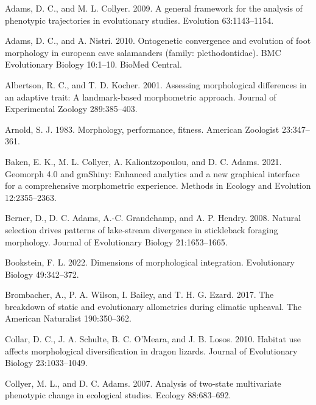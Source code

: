 \documentclass[
  11pt,
]{article}
\newlength{\cslhangindent}
\newlength{\cslentryspacingunit} %
\newenvironment{CSLReferences}[2] %
 {%
  \setlength{\parindent}{0pt}
  \ifodd #1
  \let\oldpar\par
  \def\par{\hangindent=\cslhangindent\oldpar}
  \fi
  \setlength{\parskip}{#2\cslentryspacingunit}
 }%
 {}
\begin{document}
\hypertarget{refs}{}
\begin{CSLReferences}{1}{0}
\leavevmode{}%
Adams, D. C., and M. L. Collyer. 2009. A general framework for the
analysis of phenotypic trajectories in evolutionary studies. Evolution
63:1143--1154.

\leavevmode{}%
Adams, D. C., and A. Nistri. 2010. Ontogenetic convergence and evolution
of foot morphology in european cave salamanders (family:
plethodontidae). BMC Evolutionary Biology 10:1--10. BioMed Central.

\leavevmode{}%
Albertson, R. C., and T. D. Kocher. 2001. Assessing morphological
differences in an adaptive trait: A landmark-based morphometric
approach. Journal of Experimental Zoology 289:385--403.

\leavevmode{}%
Arnold, S. J. 1983. Morphology, performance, fitness. American Zoologist
23:347--361.

\leavevmode{}%
Baken, E. K., M. L. Collyer, A. Kaliontzopoulou, and D. C. Adams. 2021.
Geomorph 4.0 and gmShiny: Enhanced analytics and a new graphical
interface for a comprehensive morphometric experience. Methods in
Ecology and Evolution 12:2355--2363.

\leavevmode{}%
Berner, D., D. C. Adams, A.-C. Grandchamp, and A. P. Hendry. 2008.
Natural selection drives patterns of lake-stream divergence in
stickleback foraging morphology. Journal of Evolutionary Biology
21:1653--1665.

\leavevmode{}%
Bookstein, F. L. 2022. Dimensions of morphological integration.
Evolutionary Biology 49:342--372.

\leavevmode{}%
Brombacher, A., P. A. Wilson, I. Bailey, and T. H. G. Ezard. 2017. The
breakdown of static and evolutionary allometries during climatic
upheaval. The American Naturalist 190:350--362.

\leavevmode{}%
Collar, D. C., J. A. Schulte, B. C. O'Meara, and J. B. Losos. 2010.
Habitat use affects morphological diversification in dragon lizards.
Journal of Evolutionary Biology 23:1033--1049.

\leavevmode{}%
Collyer, M. L., and D. C. Adams. 2007. Analysis of two-state
multivariate phenotypic change in ecological studies. Ecology
88:683--692.


\end{CSLReferences}
\end{document}
